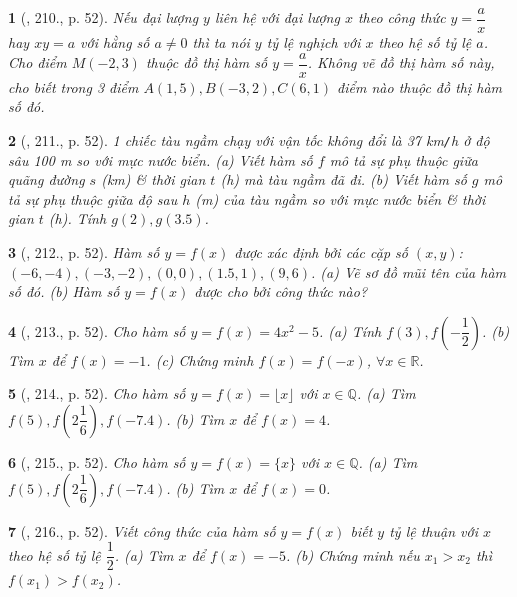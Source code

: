 \documentclass{article}
\newtheorem{baitoan}{}
\begin{document}
\begin{baitoan}[\cite{Tuyen_Toan_8}, 210., p. 52]
	Nếu đại lượng $y$ liên hệ với đại lượng $x$ theo công thức $y = \dfrac{a}{x}$ hay $xy = a$ với hằng số $a\ne0$ thì ta nói $y$ tỷ lệ nghịch với $x$ theo hệ số tỷ lệ $a$. Cho điểm $M(-2,3)$ thuộc đồ thị hàm số $y = \dfrac{a}{x}$. Không vẽ đồ thị hàm số này, cho biết trong 3 điểm $A(1,5),B(-3,2),C(6,1)$ điểm nào thuộc đồ thị hàm số đó.
\end{baitoan}

\begin{baitoan}[\cite{Tuyen_Toan_8}, 211., p. 52]
	1 chiếc tàu ngầm chạy với vận tốc không đổi là {\rm37 km{\tt/}h} ở độ sâu {\rm100 m} so với mực nước biển. (a) Viết hàm số $f$ mô tả sự phụ thuộc giữa quãng đường $s$ ({\rm km}) \& thời gian $t$ ({\rm h}) mà tàu ngầm đã đi. (b) Viết hàm số $g$ mô tả sự phụ thuộc giữa độ sau $h$ ({\rm m}) của tàu ngầm so với mực nước biển \& thời gian $t$ ({\rm h}). Tính $g(2),g(3.5)$.
\end{baitoan}

\begin{baitoan}[\cite{Tuyen_Toan_8}, 212., p. 52]
	Hàm số $y = f(x)$ được xác định bởi các cặp số $(x,y)$: $(-6,-4),(-3,-2),(0,0),(1.5,1),(9,6)$. (a) Vẽ sơ đồ mũi tên của hàm số đó. (b) Hàm số $y = f(x)$ được cho bởi công thức nào?
\end{baitoan}

\begin{baitoan}[\cite{Tuyen_Toan_8}, 213., p. 52]
	Cho hàm số $y = f(x) = 4x^2 - 5$. (a) Tính $f(3),f\left(-\dfrac{1}{2}\right)$. (b) Tìm $x$ để $f(x) = -1$. (c) Chứng minh $f(x) = f(-x)$, $\forall x\in\mathbb{R}$.
\end{baitoan}

\begin{baitoan}[\cite{Tuyen_Toan_8}, 214., p. 52]
	Cho hàm số $y = f(x) = \lfloor x\rfloor$ với $x\in\mathbb{Q}$. (a) Tìm $f(5),f\left(2\dfrac{1}{6}\right),f(-7.4)$. (b) Tìm $x$ để $f(x) = 4$.
\end{baitoan}

\begin{baitoan}[\cite{Tuyen_Toan_8}, 215., p. 52]
	Cho hàm số $y = f(x) = \{x\}$ với $x\in\mathbb{Q}$. (a) Tìm $f(5),f\left(2\dfrac{1}{6}\right),f(-7.4)$. (b) Tìm $x$ để $f(x) = 0$.
\end{baitoan}

\begin{baitoan}[\cite{Tuyen_Toan_8}, 216., p. 52]
	Viết công thức của hàm số $y = f(x)$ biết $y$ tỷ lệ thuận với $x$ theo hệ số tỷ lệ $\dfrac{1}{2}$. (a) Tìm $x$ để $f(x) = -5$. (b) Chứng minh nếu $x_1 > x_2$ thì $f(x_1) > f(x_2)$.
\end{baitoan}
\end{document}
